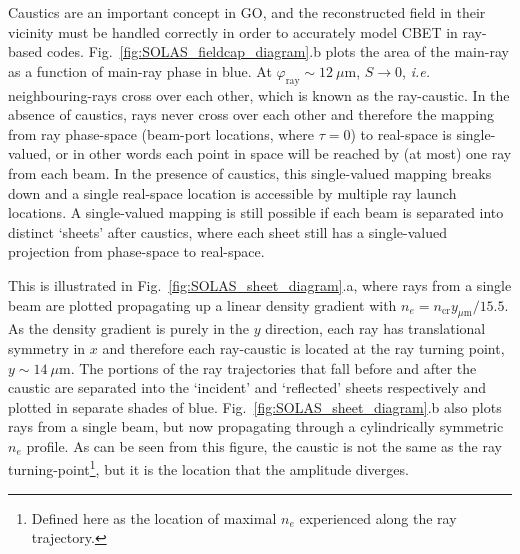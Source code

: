 Caustics are an important concept in \ac{GO}, and the reconstructed field in their vicinity must be handled correctly in order to accurately model \ac{CBET} in ray-based codes.
Fig.~\ref{fig:SOLAS_fieldcap_diagram}.b plots the area of the main-ray as a function of main-ray phase in blue.
At $\varphi_{\text{ray}}\sim12\ \mu\text{m}$, $S\rightarrow 0$, \textit{i.e.} neighbouring-rays cross over each other, which is known as the ray-caustic.
In the absence of caustics, rays never cross over each other and therefore the mapping from ray phase-space (beam-port locations, where $\tau=0$) to real-space is single-valued, or in other words each point in space will be reached by (at most) one ray from each beam.
In the presence of caustics, this single-valued mapping breaks down and a single real-space location is accessible by multiple ray launch locations.
A single-valued mapping is still possible if each beam is separated into distinct `sheets' after caustics, where each sheet still has a single-valued projection from phase-space to real-space.

This is illustrated in Fig.~\ref{fig:SOLAS_sheet_diagram}.a, where rays from a single beam are plotted propagating up a linear density gradient with $n_e=n_{\text{cr}}y_{\mu\text{m}}/15.5$.
As the density gradient is purely in the $y$ direction, each ray has translational symmetry in $x$ and therefore each ray-caustic is located at the ray turning point, $y\sim14\ \mu\text{m}$.
The portions of the ray trajectories that fall before and after the caustic are separated into the `incident' and `reflected' sheets respectively and plotted in separate shades of blue.
Fig.~\ref{fig:SOLAS_sheet_diagram}.b also plots rays from a single beam, but now propagating through a cylindrically symmetric $n_e$ profile.
As can be seen from this figure, the caustic is not the same as the ray turning-point\footnote{Defined here as the location of maximal $n_e$ experienced along the ray trajectory.}, but it is the location that the amplitude diverges.

